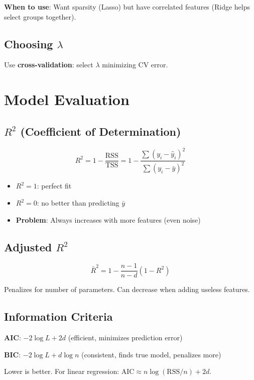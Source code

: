 \documentclass[main.tex]{subfiles}
\begin{document}
\textbf{When to use}: Want sparsity (Lasso) but have correlated features (Ridge helps select groups together).

\subsection{Choosing $\lambda$}

Use \textbf{cross-validation}: select $\lambda$ minimizing CV error.

\section{Model Evaluation}

\subsection{$R^2$ (Coefficient of Determination)}

$$R^2 = 1 - \frac{\text{RSS}}{\text{TSS}} = 1 - \frac{\sum(y_i - \hat{y}_i)^2}{\sum(y_i - \bar{y})^2}$$

\begin{itemize}
    \item $R^2 = 1$: perfect fit
    \item $R^2 = 0$: no better than predicting $\bar{y}$
    \item \textbf{Problem}: Always increases with more features (even noise)
\end{itemize}

\subsection{Adjusted $R^2$}

$$\bar{R}^2 = 1 - \frac{n-1}{n-d}(1 - R^2)$$

Penalizes for number of parameters. Can decrease when adding useless features.

\subsection{Information Criteria}

\textbf{AIC}: $-2\log L + 2d$ \quad (efficient, minimizes prediction error)

\textbf{BIC}: $-2\log L + d\log n$ \quad (consistent, finds true model, penalizes more)

Lower is better. For linear regression: $\text{AIC} \approx n\log(\text{RSS}/n) + 2d$.
\end{document}
